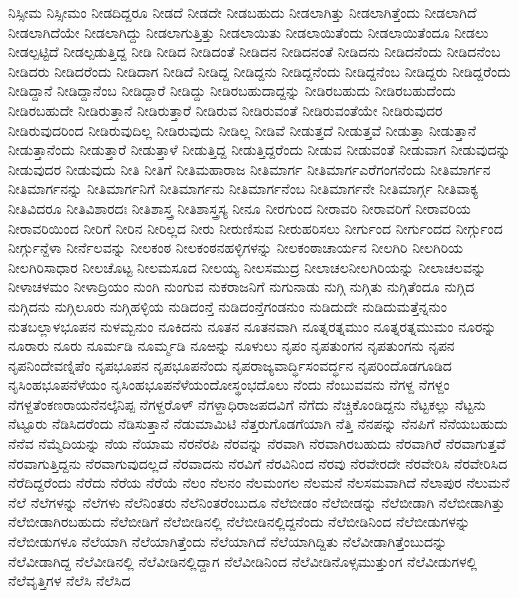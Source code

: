 {ನಿಸ್ಸೀಮ
ನಿಸ್ಸೀಮಂ
ನೀಡದಿದ್ದರೂ
ನೀಡದೆ
ನೀಡದೇ
ನೀಡಬಹುದು
ನೀಡಲಾಗಿತ್ತು
ನೀಡಲಾಗಿತ್ತೆಂದು
ನೀಡಲಾಗಿದೆ
ನೀಡಲಾಗಿದೆಯೇ
ನೀಡಲಾಗಿದ್ದು
ನೀಡಲಾಗುತ್ತಿತ್ತು
ನೀಡಲಾಯಿತು
ನೀಡಲಾಯಿತೆಂದು
ನೀಡಲಾಯಿತೆಂದೂ
ನೀಡಲು
ನೀಡಲ್ಪಟ್ಟಿದೆ
ನೀಡಲ್ಪಡುತ್ತಿದ್ದ
ನೀಡಿ
ನೀಡಿದ
ನೀಡಿದಂತೆ
ನೀಡಿದನ
ನೀಡಿದನಂತೆ
ನೀಡಿದನು
ನೀಡಿದನೆಂದು
ನೀಡಿದನೆಂಬ
ನೀಡಿದರು
ನೀಡಿದರೆಂದು
ನೀಡಿದಾಗ
ನೀಡಿದೆ
ನೀಡಿದ್ದ
ನೀಡಿದ್ದನು
ನೀಡಿದ್ದನೆಂದು
ನೀಡಿದ್ದನೆಂಬ
ನೀಡಿದ್ದರು
ನೀಡಿದ್ದರೆಂದು
ನೀಡಿದ್ದಾನೆ
ನೀಡಿದ್ದಾನೆಂಬ
ನೀಡಿದ್ದಾರೆ
ನೀಡಿದ್ದು
ನೀಡಿರಬಹುದಾದ್ದನ್ನು
ನೀಡಿರಬಹುದು
ನೀಡಿರಬಹುದೆಂದು
ನೀಡಿರಬಹುದೇ
ನೀಡಿರುತ್ತಾನೆ
ನೀಡಿರುತ್ತಾರೆ
ನೀಡಿರುವ
ನೀಡಿರುವಂತೆ
ನೀಡಿರುವಂತೆಯೇ
ನೀಡಿರುವುದರ
ನೀಡಿರುವುದರಿಂದ
ನೀಡಿರುವುದಿಲ್ಲ
ನೀಡಿರುವುದು
ನೀಡಿಲ್ಲ
ನೀಡಿವೆ
ನೀಡುತ್ತದೆ
ನೀಡುತ್ತವೆ
ನೀಡುತ್ತಾ
ನೀಡುತ್ತಾನೆ
ನೀಡುತ್ತಾನೆಂದು
ನೀಡುತ್ತಾರೆ
ನೀಡುತ್ತಾಳೆ
ನೀಡುತ್ತಿದ್ದ
ನೀಡುತ್ತಿದ್ದರೆಂದು
ನೀಡುವ
ನೀಡುವಂತೆ
ನೀಡುವಾಗ
ನೀಡುವುದನ್ನು
ನೀಡುವುದರ
ನೀಡುವುದು
ನೀತಿ
ನೀತಿಗೆ
ನೀತಿಮಹಾರಾಜ
ನೀತಿಮಾರ್ಗ
ನೀತಿಮಾರ್ಗಎರೆಗಂಗನೆಂದು
ನೀತಿಮಾರ್ಗನ
ನೀತಿಮಾರ್ಗನನ್ನು
ನೀತಿಮಾರ್ಗನಿಗೆ
ನೀತಿಮಾರ್ಗನು
ನೀತಿಮಾರ್ಗನೆಂಬ
ನೀತಿಮಾರ್ಗನೇ
ನೀತಿಮಾರ್ಗ್ಗ
ನೀತಿವಾಕ್ಯ
ನೀತಿವಿದರೂ
ನೀತಿವಿಶಾರದಃ
ನೀತಿಶಾಸ್ತ್ರ
ನೀತಿಶಾಸ್ತ್ರಸ್ಯ
ನೀನೂ
ನೀರಗುಂದ
ನೀರಾವರಿ
ನೀರಾವರಿಗೆ
ನೀರಾವರಿಯ
ನೀರಾವರಿಯಿಂದ
ನೀರಿಗೆ
ನೀರಿನ
ನೀರಿಲ್ಲದ
ನೀರು
ನೀರುಣಿಸುವ
ನೀರುಹರಿಸಲು
ನೀರ್ಗುಂದ
ನೀರ್ಗುಂದದ
ನೀರ್ಗ್ಗುಂದ
ನೀರ್ಗ್ಗುನ್ದೆಳಾ
ನೀರ್ನೆಲವನ್ನು
ನೀಲಕಂಠ
ನೀಲಕಂಠನಹಳ್ಳಿಗಳನ್ನು
ನೀಲಕಂಠಾಚಾರ್ಯನ
ನೀಲಗಿರಿ
ನೀಲಗಿರಿಯ
ನೀಲಗಿರಿಸಾಧಾರ
ನೀಲಚೊಟ್ಟ
ನೀಲಮಸೂದ
ನೀಲಯ್ಯ
ನೀಲಸಮುದ್ರ
ನೀಲಾಚಲನೀಲಗಿರಿಯನ್ನು
ನೀಲಾಚಲವನ್ನು
ನೀಳಾಚಳಮಂ
ನೀಳಾದ್ರಿಯಂ
ನುಂಗಿ
ನುಂಗುವ
ನುಕರಾಜನಿಗೆ
ನುಗುನಾಡು
ನುಗ್ಗಿ
ನುಗ್ಗಿತು
ನುಗ್ಗಿತೆಂದೂ
ನುಗ್ಗಿದ
ನುಗ್ಗಿದನು
ನುಗ್ಗಿಲೂರು
ನುಗ್ಗಿಹಳ್ಳಿಯ
ನುಡಿದಂನ್ತೆ
ನುಡಿದಂನ್ತೆಗಂಡನುಂ
ನುಡಿದುದೇ
ನುಡಿದುಮತ್ತೆನ್ನನುಂ
ನುತಬಲ್ಲಾಳಭೂಪನ
ನುಳಮ್ಬನುಂ
ನೂಕಿದನು
ನೂತನ
ನೂತನವಾಗಿ
ನೂತ್ನರತ್ನಮುಂ
ನೂತ್ನರತ್ನಮುಮಂ
ನೂರನ್ನು
ನೂರಾರು
ನೂರು
ನೂರ್ಮಡಿ
ನೂರ್ಮ್ಮಡಿ
ನೂಱನ್ನು
ನೂಳುಲು
ನೃಪಂ
ನೃಪತುಂಗನ
ನೃಪತುಂಗನು
ನೃಪನ
ನೃಪನಿಂದೇವಣ್ನಿಪೆಂ
ನೃಪಭೂಪನ
ನೃಪಭೂಪನೆಂದು
ನೃಪರಾಜ್ಯವಾರ್ದ್ಧಿಸಂವರ್ದ್ಧನ
ನೃಪರಿಂದೊಡಗೂಡಿದ
ನೃಸಿಂಹಭೂಪನೆಳೆಯಂ
ನೃಸಿಂಹಭೂಪನೆಳೆಯಂದೋಸ್ಥಂಭದೊಲು
ನೆಂದು
ನೆಂಬುವವನು
ನೆಗಳ್ದ
ನೆಗಳ್ದಂ
ನೆಗಳ್ದತೆಂಕಣರಾಯನೆನಲ್ಕೆನಿಪ್ಪ
ನೆಗಳ್ದರೊಳ್
ನೆಗಳ್ದಾಧಿರಾಜಪದವಿಗೆ
ನೆಗೆದು
ನೆಚ್ಚಿಕೊಂಡಿದ್ದನು
ನೆಟ್ಟಕಲ್ಲು
ನೆಟ್ಟನು
ನೆಟ್ಟೂರು
ನೆಡಿಸಿದರೆಂದು
ನೆಡಿಸುತ್ತಾನೆ
ನೆಡುಮಾಮಿಟಿ
ನೆತ್ತರುಗೊಡಗೆಯಾಗಿ
ನೆತ್ತಿ
ನೆನಪನ್ನು
ನೆನಪಿಗೆ
ನೆನೆಯಬಹುದು
ನೆನೆವ
ನೆಮ್ಮೆದಿಯನ್ನು
ನೆಯ
ನೆಯಾಮ
ನೆರನೆರಪಿ
ನೆರವನ್ನು
ನೆರವಾಗಿ
ನೆರವಾಗಿರಬಹುದು
ನೆರವಾಗಿರೆ
ನೆರವಾಗುತ್ತವೆ
ನೆರವಾಗುತ್ತಿದ್ದನು
ನೆರವಾಗುವುದಲ್ಲದೆ
ನೆರವಾದನು
ನೆರವಿಗೆ
ನೆರವಿನಿಂದ
ನೆರವು
ನೆರವೇರದೇ
ನೆರವೇರಿಸಿ
ನೆರವೇರಿಸಿದ
ನೆರೆದಿದ್ದರೆಂದು
ನೆರೆದು
ನೆರೆಯ
ನೆರೆಯೆ
ನೆಲಂ
ನೆಲನಂ
ನೆಲಮಂಗಲ
ನೆಲಮನೆ
ನೆಲಸಮವಾಗಿದೆ
ನೆಲಾಪುರ
ನೆಲುಮನೆ
ನೆಲೆ
ನೆಲೆಗಳನ್ನು
ನೆಲೆಗಳು
ನೆಲೆನಿಂತರು
ನೆಲೆನಿಂತರೆಂಬುದೂ
ನೆಲೆಬೀಡಂ
ನೆಲೆಬೀಡನ್ನು
ನೆಲೆಬೀಡಾಗಿ
ನೆಲೆಬೀಡಾಗಿತ್ತು
ನೆಲೆಬೀಡಾಗಿರಬಹುದು
ನೆಲೆಬೀಡಿಗೆ
ನೆಲೆಬೀಡಿನಲ್ಲಿ
ನೆಲೆಬೀಡಿನಲ್ಲಿದ್ದನೆಂದು
ನೆಲೆಬೀಡಿನಿಂದ
ನೆಲೆಬೀಡುಗಳನ್ನು
ನೆಲೆಬೀಡುಗಳೂ
ನೆಲೆಯಾಗಿ
ನೆಲೆಯಾಗಿತ್ತೆಂದು
ನೆಲೆಯಾಗಿದೆ
ನೆಲೆಯಾಗಿದ್ದಿತು
ನೆಲೆವೀಡಾಗಿತ್ತೆಂಬುದನ್ನು
ನೆಲೆವೀಡಾಗಿದ್ದ
ನೆಲೆವೀಡಿನಲ್ಲಿ
ನೆಲೆವೀಡಿನಲ್ಲಿದ್ದಾಗ
ನೆಲೆವೀಡಿನಿಂದ
ನೆಲೆವೀಡಿನೊಳ್ಸಮುತ್ತುಂಗ
ನೆಲೆವೀಡುಗಳಲ್ಲಿ
ನೆಲೆವೃತ್ತಿಗಳ
ನೆಲೆಸಿ
ನೆಲೆಸಿದ
}
